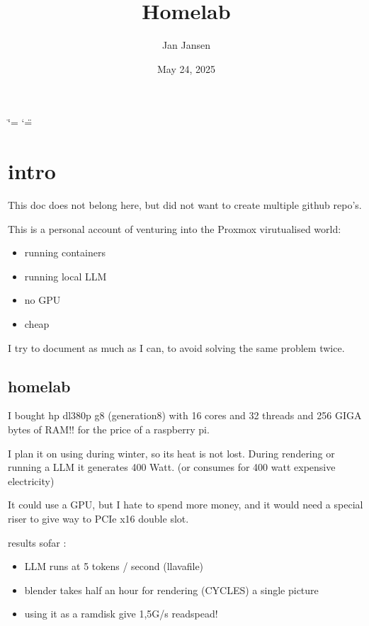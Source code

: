 \documentclass[letterpaper,10pt,english]{sphinxmanual}
\title{Homelab}
\date{May 24, 2025}
\author{Jan Jansen}
\begin{document}
\ifdefined\shorthandoff
  \ifnum\catcode`\=\string=\active\shorthandoff{=}\fi
  \ifnum\catcode`\"=\active{}\fi
\fi

\pagestyle{empty}
\sphinxmaketitle
\pagestyle{plain}
\sphinxtableofcontents
\pagestyle{normal}
\label{\detokenize{index::doc}}


\sphinxstepscope


\chapter{intro}
\label{\detokenize{intro:intro}}\label{\detokenize{intro::doc}}
\sphinxAtStartPar
This doc does not belong here, but did not want to create multiple github repo’s.

\sphinxAtStartPar
This is a personal account of venturing into the Proxmox virutualised world:
\begin{itemize}
\item {} 
\sphinxAtStartPar
running containers

\item {} 
\sphinxAtStartPar
running local LLM

\item {} 
\sphinxAtStartPar
no GPU

\item {} 
\sphinxAtStartPar
cheap

\end{itemize}

\sphinxAtStartPar
I try to document as much as I can, to avoid solving the same problem twice.


\section{homelab}
\label{\detokenize{intro:homelab}}
\sphinxAtStartPar
I bought hp dl380p g8 (generation8) with 16 cores and 32 threads and 256 GIGA bytes of RAM!! for the price of a raspberry pi.

\sphinxAtStartPar
I plan it on using during winter, so its heat is not lost. During rendering or running a LLM it generates 400 Watt. (or consumes for 400 watt expensive electricity)

\sphinxAtStartPar
It could use a GPU, but I hate to spend more money, and it would need a special riser to give way to PCIe x16 double slot.

\sphinxAtStartPar
results sofar :
\begin{itemize}
\item {} 
\sphinxAtStartPar
LLM runs at 5 tokens / second (llavafile)

\item {} 
\sphinxAtStartPar
blender takes half an hour for rendering (CYCLES) a single picture

\item {} 
\sphinxAtStartPar
using it as a  ramdisk give 1,5G/s readspead!

\end{itemize}
\end{document}
